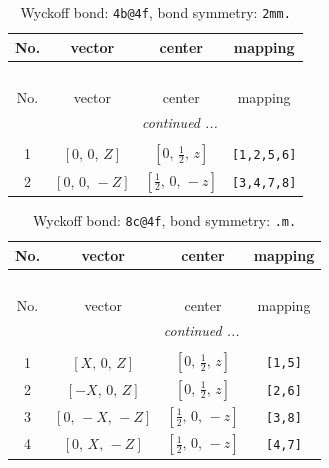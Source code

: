 \documentclass[fleqn,8pt]{jsarticle}
\begin{document}
\renewcommand{\arraystretch}{1.2}
\begin{longtable}{cccc}
\caption{Wyckoff bond: {\tt 4b@4f}, bond symmetry: {\tt 2mm.}}
 \\
 \hline \hline
No. & vector & center & mapping \\ \hline \endfirsthead

\multicolumn{3}{l}{\tablename\ \thetable{}} \\
 \hline \hline
No. & vector & center & mapping \\ \hline \endhead

 \hline \hline
\multicolumn{3}{r}{\footnotesize\it continued ...} \\ \endfoot

 \hline \hline
\multicolumn{3}{r}{} \\ \endlastfoot

1 & $\left[ 0,\, 0,\, Z \right]$ & $\left[ 0,\, \frac{1}{2},\, z \right]$ & {\tt [1,2,5,6]} \\ \hline
2 & $\left[ 0,\, 0,\, - Z \right]$ & $\left[ \frac{1}{2},\, 0,\, - z \right]$ & {\tt [3,4,7,8]} \\
\end{longtable}
\renewcommand{\arraystretch}{1.2}
\begin{longtable}{cccc}
\caption{Wyckoff bond: {\tt 8c@4f}, bond symmetry: {\tt .m.}}
 \\
 \hline \hline
No. & vector & center & mapping \\ \hline \endfirsthead

\multicolumn{3}{l}{\tablename\ \thetable{}} \\
 \hline \hline
No. & vector & center & mapping \\ \hline \endhead

 \hline \hline
\multicolumn{3}{r}{\footnotesize\it continued ...} \\ \endfoot

 \hline \hline
\multicolumn{3}{r}{} \\ \endlastfoot

1 & $\left[ X,\, 0,\, Z \right]$ & $\left[ 0,\, \frac{1}{2},\, z \right]$ & {\tt [1,5]} \\ \hline
2 & $\left[ - X,\, 0,\, Z \right]$ & $\left[ 0,\, \frac{1}{2},\, z \right]$ & {\tt [2,6]} \\ \hline
3 & $\left[ 0,\, - X,\, - Z \right]$ & $\left[ \frac{1}{2},\, 0,\, - z \right]$ & {\tt [3,8]} \\ \hline
4 & $\left[ 0,\, X,\, - Z \right]$ & $\left[ \frac{1}{2},\, 0,\, - z \right]$ & {\tt [4,7]} \\
\end{longtable}
\end{document}
